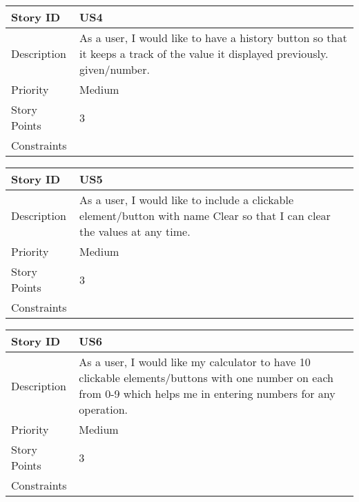 \documentclass[12pt]{article}
\begin{document}
\newline
\newline
\begin{tabular}{|p{7cm}|p{10cm}| }
\hline
 Story ID & US4\\
 \hline
 Description &  As a user, I would like to have a history button so that it keeps a track of the value it displayed previously. given/number.  \\
 \hline
 Priority & Medium  \\
  \hline
Story Points & 3  \\
  \hline
Constraints &   \\
  \hline
\end{tabular}
\newline
\newline
\newline
\begin{tabular}{|p{7cm}|p{10cm}| }
\hline
 Story ID & US5\\
 \hline
 Description &  As a user, I would like to include a clickable element/button with name Clear so that I can clear the values at any time.  \\
 \hline
 Priority & Medium  \\
  \hline
Story Points & 3  \\
  \hline
Constraints &   \\
  \hline
\end{tabular}
\newline
\newline
\newline
\begin{tabular}{|p{7cm}|p{10cm}| }
\hline
 Story ID & US6\\
 \hline
 Description &  As a user, I would like my calculator to have 10 clickable elements/buttons with one number on each from 0-9 which helps me in entering numbers for any operation.  \\
 \hline
 Priority & Medium  \\
  \hline
Story Points & 3  \\
  \hline
Constraints &   \\
  \hline
\end{tabular}
\end{document}
